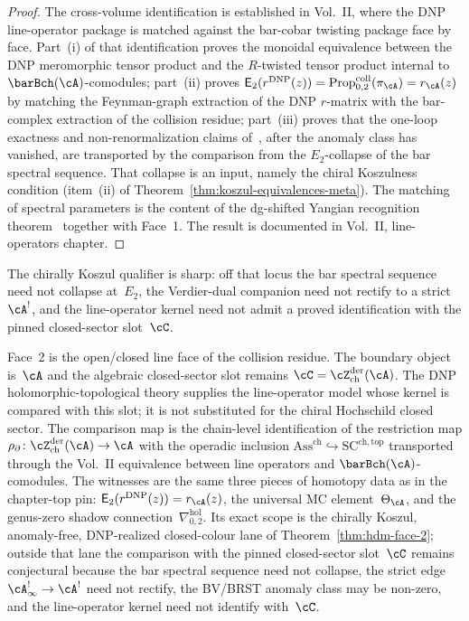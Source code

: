 \begin{proof}
The cross-volume identification is established in
Vol.~II, where the DNP line-operator package is matched against the
bar-cobar twisting package face by face. Part~(i) of that
identification proves the monoidal equivalence between the DNP
meromorphic tensor product and the $R$-twisted tensor product
internal to $\barBch(\cA)$-comodules; part~(ii) proves
$\mathsf E_2(r^{\mathrm{DNP}}(z)) =
\operatorname{Prop}^{\mathrm{coll}}_{0,2}(\pi_\cA)=r_\cA(z)$ by
matching the Feynman-graph extraction of the DNP $r$-matrix with the
bar-complex extraction of the collision residue; part~(iii) proves that the
one-loop exactness and non-renormalization claims of~\cite{DNP25},
after the anomaly class has vanished, are transported by the comparison
from the $E_2$-collapse of the bar spectral sequence. That collapse is
an input, namely the chiral Koszulness condition (item~(ii) of
Theorem~\ref{thm:koszul-equivalences-meta}). The matching of
spectral parameters is the content of the dg-shifted Yangian
recognition theorem~\cite[Thm.~5.5]{DNP25} together with
Face~1. The result is documented in Vol.~II, line-operators
chapter.
\end{proof}

The chirally Koszul qualifier is sharp: off that locus the bar
spectral sequence need not collapse at~$E_2$, the Verdier-dual
companion need not rectify to a strict~$\cA^!$, and the line-operator
kernel need not admit a proved identification with the pinned
closed-sector slot~$\cC$.

Face~2 is the open/closed line face of the collision residue. The
boundary object is~$\cA$ and the algebraic closed-sector slot remains
$\cC=\cZ^{\mathrm{der}}_{\mathrm{ch}}(\cA)$. The DNP
holomorphic-topological theory supplies the line-operator model whose
kernel is compared with this slot; it is not substituted for the
chiral Hochschild closed sector. The comparison map is the chain-level
identification of the restriction map
$\rho_{\partial}\colon \cZ^{\mathrm{der}}_{\mathrm{ch}}(\cA)\to \cA$
with the operadic inclusion
$\mathrm{Ass}^{\mathrm{ch}}\hookrightarrow\mathrm{SC}^{\mathrm{ch,top}}$
transported through the Vol.~II equivalence between line operators and
$\barBch(\cA)$-comodules. The witnesses are the same three pieces of
homotopy data as in the chapter-top pin:
$\mathsf E_2(r^{\mathrm{DNP}}(z))=r_\cA(z)$, the universal MC
element~$\Theta_\cA$,
and the genus-zero shadow connection~$\nabla^{\mathrm{hol}}_{0,2}$.
Its exact scope is the chirally Koszul, anomaly-free,
DNP-realized closed-colour lane of Theorem~\ref{thm:hdm-face-2};
outside that lane the comparison with the pinned closed-sector slot~$\cC$
remains conjectural because the bar spectral sequence need not
collapse, the strict edge $\cA^{!}_\infty\to\cA^!$ need not rectify,
the BV/BRST anomaly class may be non-zero, and the line-operator
kernel need not identify with~$\cC$.

